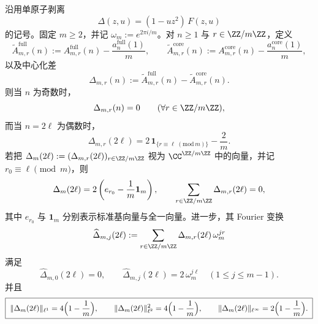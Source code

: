 \begin{theorem}\label{thm:xi-single-atom-centered-residue-rankone-spike}
沿用单原子剥离
\[
\Delta(z,u)=(1-uz^2)\,F(z,u)
\]
的记号。固定 \(m\ge 2\)，并记 \(\omega_m:=e^{2\pi i/m}\)。对 \(n\ge 1\) 与 \(r\in \ZZ/m\ZZ\)，定义
\[
\widetilde A_{m,r}^{\mathrm{full}}(n)
:=
A_{m,r}^{\mathrm{full}}(n)-\frac{a_n^{\mathrm{full}}(1)}{m},
\qquad
\widetilde A_{m,r}^{\mathrm{core}}(n)
:=
A_{m,r}^{\mathrm{core}}(n)-\frac{a_n^{\mathrm{core}}(1)}{m},
\]
以及中心化差
\[
\Delta_{m,r}(n)
:=
\widetilde A_{m,r}^{\mathrm{full}}(n)-\widetilde A_{m,r}^{\mathrm{core}}(n).
\]
则当 \(n\) 为奇数时，
\[
\Delta_{m,r}(n)=0
\qquad(\forall r\in\ZZ/m\ZZ),
\]
而当 \(n=2\ell\) 为偶数时，
\[
\boxed{\;
\Delta_{m,r}(2\ell)
=
2\,\mathbf 1_{\{r\equiv \ell\;(\mathrm{mod}\,m)\}}-\frac{2}{m}.\;}
\]
若把
\(
\Delta_m(2\ell):=(\Delta_{m,r}(2\ell))_{r\in\ZZ/m\ZZ}
\)
视为 \(\CC^{\ZZ/m\ZZ}\) 中的向量，并记 \(r_0\equiv \ell\pmod m\)，则
\[
\Delta_m(2\ell)=2\left(e_{r_0}-\frac{1}{m}\mathbf 1_m\right),
\qquad
\sum_{r\in\ZZ/m\ZZ}\Delta_{m,r}(2\ell)=0,
\]
其中 \(e_{r_0}\) 与 \(\mathbf 1_m\) 分别表示标准基向量与全一向量。进一步，其 Fourier 变换
\[
\widehat\Delta_{m,j}(2\ell)
:=
\sum_{r\in\ZZ/m\ZZ}\Delta_{m,r}(2\ell)\,\omega_m^{jr}
\]
满足
\[
\boxed{\;
\widehat\Delta_{m,0}(2\ell)=0,\qquad
\widehat\Delta_{m,j}(2\ell)=2\,\omega_m^{j\ell}\quad(1\le j\le m-1).\;}
\]
并且
\[
\boxed{\;
\|\Delta_m(2\ell)\|_{\ell^1}=4\Bigl(1-\frac1m\Bigr),\qquad
\|\Delta_m(2\ell)\|_{\ell^2}^2=4\Bigl(1-\frac1m\Bigr),\qquad
\|\Delta_m(2\ell)\|_{\ell^\infty}=2\Bigl(1-\frac1m\Bigr).\;}
\]
\end{theorem}

